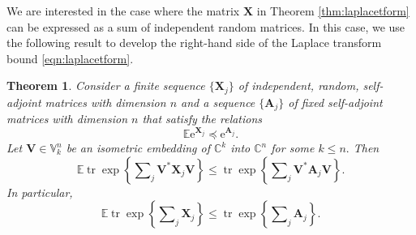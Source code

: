 \documentclass[11pt,letterpaper,twoside,reqno,nosumlimits]{amsart}
\renewcommand{\star}{*}
\newcommand{\mat}[1]{\ensuremath{\bm{#1}}} %
\newcommand{\e}{\ensuremath{\mathrm{e}}}
\newcommand{\E}{\ensuremath{\mathbb{E}}}
\newcommand{\C}{\ensuremath{\mathbb{C}}}
\newcommand{\Isom}[2]{\ensuremath{\mathbb{V}_{#1}^{#2}}}
\DeclareMathOperator{\tr}{tr}
\newcommand{\trexp}[1]{\ensuremath{\tr\exp\left\{#1\right\}}}
\newtheorem{thm}{Theorem}
\theoremstyle{remark}
\newtheorem{remark}{Remark}
\numberwithin{equation}{section}
\numberwithin{thm}{section}
\numberwithin{prop}{section}
\numberwithin{defn}{section}
\numberwithin{remark}{section}
\begin{document}
We are interested in the case where the matrix $\mat{X}$ in Theorem \ref{thm:laplacetform} can be expressed as a sum of independent random matrices. In this case, we use the following result to develop the right-hand side of the Laplace transform bound \eqref{eqn:laplacetform}.



\begin{thm}
Consider a finite sequence $\{\mat{X}_j\}$ of independent, random, self-adjoint matrices with dimension $n$ and a sequence $\{\mat{A}_j\}$ of fixed self-adjoint matrices with dimension $n$ that satisfy the relations
\begin{equation}
 \E\e^{\mat{X}_j} \preceq \e^{\mat{A}_j}. 
 \label{eqn:logmgfdomination}
\end{equation}
Let $\mat{V} \in \Isom{k}{n}$ be an isometric embedding of $\C^k$ into $\C^n$ for some $k \leq n.$ Then
\begin{equation}
 \E \tr \exp\left\{\sum\nolimits_j \mat{V}^\star \mat{X}_j \mat{V} \right\} \leq \tr \exp\left\{\sum\nolimits_j \mat{V}^\star \mat{A}_j \mat{V} \right\}.
 \label{eqn:pinchedmgf}
\end{equation}
In particular, 
\begin{equation}
 \E \tr \exp\left\{\sum\nolimits_j \mat{X}_j \right\} \leq \tr \exp\left\{\sum\nolimits_j \mat{A}_j \right\}.
 \label{eqn:unpinchedmgf}
\end{equation}

\label{thm:mgf}
\end{thm}

\end{document}
